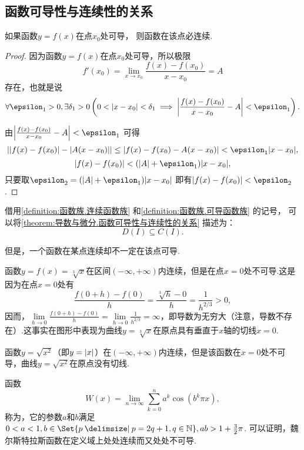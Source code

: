 \subsection{函数可导性与连续性的关系}
\begin{theorem}\label{theorem:导数与微分.函数可导性与连续性的关系}
如果函数\(y = f(x)\)在点\(x_0\)处可导，
则函数在该点必连续.
\begin{proof}
因为函数\(y = f(x)\)在点\(x_0\)处可导，所以极限\[
	f'(x_0) = \lim\limits_{x \to x_0}\frac{f(x)-f(x_0)}{x-x_0} = A
\]存在，也就是说\[
	\forall \epsilon_1 > 0, \exists \delta_1 > 0 \left(
		0 < \abs{x-x_0} < \delta_1 \implies \abs{\frac{f(x)-f(x_0)}{x-x_0} - A} < \epsilon_1
	\right).
\]

由\(\abs{\frac{f(x)-f(x_0)}{x-x_0} - A} < \epsilon_1\)
可得\[
	\abs{\abs{f(x)-f(x_0)} - \abs{A(x-x_0)}}
	\leq \abs{f(x)-f(x_0) - A(x-x_0)}
	< \epsilon_1 \abs{x-x_0},
\]\[
	\abs{f(x)-f(x_0)} < (\abs{A} + \epsilon_1) \abs{x-x_0},
\]
只要取\(\epsilon_2 = (\abs{A} + \epsilon_1) \abs{x-x_0}\)
即有\(\abs{f(x)-f(x_0)} < \epsilon_2\).
\end{proof}
\end{theorem}
借用\cref{definition:函数族.连续函数族} 和\cref{definition:函数族.可导函数族} 的记号，
可以将\cref{theorem:导数与微分.函数可导性与连续性的关系} 描述为：\[
	D(I) \subseteq C(I).
\]

但是，一个函数在某点连续却不一定在该点可导.
\begin{example}
函数\(y=f(x)=\sqrt[3]x\)在区间\((-\infty,+\infty)\)内连续，但是在点\(x=0\)处不可导.这是因为在点\(x=0\)处有\[
\frac{f(0+h)-f(0)}{h}
=\frac{\sqrt[3]{h}-0}{h}
=\frac{1}{h^{2/3}}>0,
\]因而，\(\lim\limits_{h\to0}\frac{f(0+h)-f(0)}{h}=\lim\limits_{h\to0}\frac{1}{h^{2/3}}=\infty\)，即导数为无穷大（注意，导数不存在）.这事实在图形中表现为曲线\(y=\sqrt[3]x\)在原点具有垂直于\(x\)轴的切线\(x=0\).
\end{example}

\begin{example}
函数\(y=\sqrt{x^2}\)（即\(y=\abs{x}\)）在\((-\infty,+\infty)\)内连续，但是该函数在\(x=0\)处不可导，曲线\(y=\sqrt{x^2}\)在原点没有切线.
\end{example}

\begin{example}
函数\[
W(x) = \lim\limits_{n\to\infty} \sum\limits_{k=0}^n a^k \cos(b^k \pi x),
\]称为，它的参数\(a\)和\(b\)满足\(0<a<1, b\in\Set{ p \given p = 2q+1, q\in\mathbb{N} }, ab > 1+\frac{3}{2}\pi\).
可以证明，魏尔斯特拉斯函数在定义域上处处连续而又处处不可导.
\end{example}

